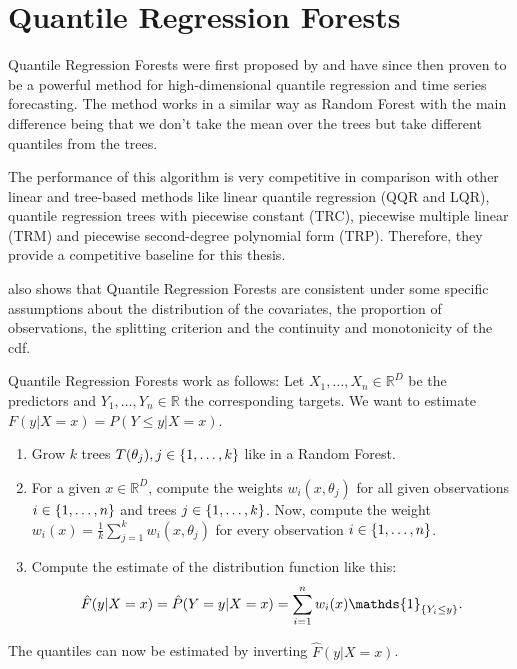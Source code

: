 \section{Quantile Regression Forests}
\label{sec:qrf}

Quantile Regression Forests were first proposed by \Textcite{Meinshausen2006}
and have since then proven to be a powerful method for high-dimensional quantile 
regression and time series forecasting. 
The method works in a similar way as Random Forest with the main difference 
being that we don't take the mean over the trees but take different quantiles 
from the trees.

The performance of this algorithm is very competitive in comparison with other 
linear and tree-based methods like linear quantile regression (QQR and LQR), quantile regression trees with 
piecewise constant (TRC), piecewise multiple linear (TRM) and piecewise second-degree polynomial form (TRP).
Therefore, they provide a competitive baseline for this thesis. 

\Textcite{Meinshausen2006} also shows that Quantile Regression Forests are consistent 
under some specific assumptions about the distribution of the covariates, the proportion of observations, the splitting criterion and the 
continuity and monotonicity of the \gls{cdf}.

Quantile Regression Forests work as follows:
Let \(X_1, \ldots, X_n \in \mathbb{R}^D\) be the predictors and 
\(Y_1, \ldots, Y_n \in \mathbb{R}\) the corresponding targets.
We want to estimate \(F(y|X=x) = P(Y\leq y| X = x)\).
\begin{enumerate}
    \item Grow \(k\) trees \(T(\theta_j), j\in\{1,\ldots,k\}\) like in a Random Forest.
    \item For a given \(x \in \mathbb{R}^D\), compute the weights \(w_i(x, \theta_j)\) 
    for all given observations \(i \in \{1,\ldots, n\}\) and trees \(j \in \{1, \ldots, k\}\).
    Now, compute the weight \(w_i(x) = \frac{1}{k} \sum_{j=1}^k w_i(x, \theta_j)\) for every 
    observation \(i \in \{1,\ldots, n\}\).
    \item Compute the estimate of the distribution function like this:
    \[ \hat{F}(y | X=x) = \hat{P}(Y=y | X=x) = \sum_{i=1}^n w_i(x) \mathds{1}_{\set{Y_i \leq y}}. \]
\end{enumerate}
The quantiles can now be estimated by inverting \(\hat{F}(y|X=x)\).